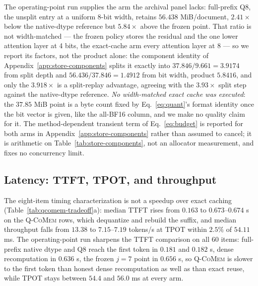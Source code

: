 \documentclass{article}
\newcommand{\qcomem}{\textsc{Q-CoMem}}
\begin{document}
The operating-point run supplies the arm the archival panel lacks: full-prefix
Q8, the unsplit entry at a uniform 8-bit width, retains $56.438$ MiB/document,
$2.41\times$ below the native-dtype reference but $5.84\times$ above the
frozen point. That ratio is not width-matched --- the frozen policy stores the
residual and the one lower attention layer at 4 bits, the exact-cache arm
every attention layer at 8 --- so we report its factors, not the product
alone: the component identity of Appendix~\ref{app:store-components} splits it
exactly into $37.846/9.661=3.9174$ from split depth and $56.436/37.846=1.4912$
from bit width, product $5.8416$, and only the $3.918\times$ is a split-replay
advantage, agreeing with the $3.93\times$ split step against the native-dtype
reference. \emph{No width-matched exact cache was executed}: the $37.85$ MiB
point is a byte count fixed by Eq.~\ref{eq:quant}'s format identity once the
bit vector is given, like the all-BF16 column, and we make no quality claim
for it. The method-dependent transient term of Eq.~\ref{eq:budget} is reported
for both arms in Appendix~\ref{app:store-components} rather than assumed to
cancel; it is arithmetic on Table~\ref{tab:store-components}, not an allocator
measurement, and fixes no concurrency limit.



\subsection{Latency: TTFT, TPOT, and throughput}
\label{sec:latency}



The eight-item timing characterization is not a speedup over exact caching
(Table~\ref{tab:qcomem-tradeoff}a): median TTFT rises from $0.163$ to
$0.673$--$0.674$ s on the \qcomem{} rows, which dequantize and rebuild the
suffix, and median throughput falls from $13.38$ to $7.15$--$7.19$ tokens/s at
TPOT within $2.5\%$ of $54.11$ ms.  The operating-point run sharpens the TTFT
comparison on all 60 items: full-prefix native dtype and Q8 reach the first
token in $0.181$ and $0.182$ s, dense recomputation in $0.636$ s, the frozen
$j=7$ point in $0.656$ s, so \qcomem{} is slower to the first token than honest
dense recomputation as well as than exact reuse, while TPOT stays between $54.4$
and $56.0$ ms at every arm.
\end{document}
